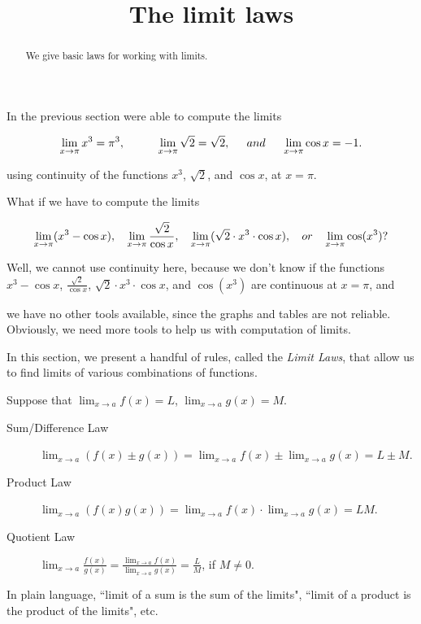 \documentclass{ximera}
\title[Dig-In:]{The limit laws}
\begin{document}
\begin{abstract}
We give basic laws for working with limits. 
\end{abstract}
\maketitle
In the previous section were able to compute the limits

\[
\lim_{x\to \pi} x^3=\pi^3,\hspace{0.4in}\lim_{x\to \pi} \sqrt{2}=\sqrt{2},\hspace{0.2in}and\hspace{0.2in}\lim_{x\to \pi} \cos{x}= -1.
\]

using continuity of the functions $x^3$, $\sqrt{2}$, and $\cos{x}$, at $x=\pi$.


What if we have to compute the limits

\[
\lim_{x\to \pi} (x^3-\cos{x}),\hspace{0.13in}\lim_{x\to \pi} \frac{\sqrt{2}}{\cos{x}},\hspace{0.13in} \lim_{x\to \pi} (\sqrt{2}\cdot x^3\cdot\cos{x}),\hspace{0.13in} or\hspace{0.13in}\lim_{x\to \pi} \cos({x^3})?
\]

Well, we cannot use continuity here, because we don't know if the functions $x^3-\cos{x}$,  $\frac{\sqrt{2}}{\cos{x}}$, $\sqrt{2}\cdot x^3\cdot\cos{x}$, and $\cos({x^3})$ are continuous at $x=\pi$,
and

 we have no other tools available, since the graphs and tables are not reliable. Obviously, we need more tools to help us with computation of limits.

 

In this section, we present a handful of rules, called the \textit{Limit Laws},
that allow us to find limits of various combinations of functions.

\begin{theorem}\label{theorem:limit-laws}
Suppose that $\lim_{x\to a}f(x)=L$, $\lim_{x\to a}g(x)=M$.
\begin{description}
\item[Sum/Difference Law] $\lim_{x\to a} (f(x) \pm g(x)) =
  \lim_{x\to a}f(x) \pm \lim_{x\to a}g(x)=L \pm M$.
\item[Product Law]  $\lim_{x\to a} (f(x)g(x)) = \lim_{x\to
  a}f(x)\cdot\lim_{x\to a}g(x)=LM$.
\item[Quotient Law]  $\lim_{x\to a} \frac{f(x)}{g(x)} =
  \frac{\lim_{x\to a}f(x)}{\lim_{x\to a}g(x)}=\frac{L}{M}$, if
  $M\ne0$.
\end{description}
\label{thm:limit laws}
\end{theorem}
In plain language, ``limit of a sum is the sum of the limits", ``limit of a product is the product of the limits", etc.
\end{document}
